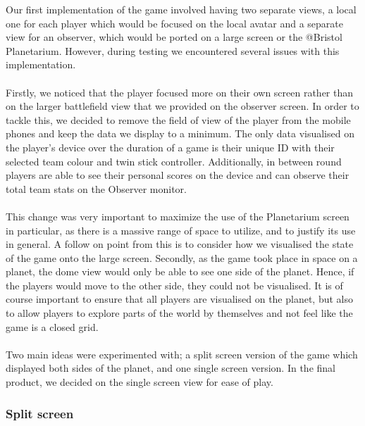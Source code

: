 \documentclass[11pt,a4paper]{article}
\begin{document}
   Our first implementation of the game involved having two separate views, a local one for each player which would be focused on the local avatar and a separate view for an observer, which would be ported on a large screen or the @Bristol Planetarium. However, during testing we encountered several issues with this implementation. \\ \\
   Firstly, we noticed that the player focused more on their own screen rather than on the larger battlefield view that we provided on the observer screen. In order to tackle this, we decided to remove the field of view of the player from the mobile phones and keep the data we display to a minimum. The only data visualised on the player’s device over the duration of a game is their unique ID with their selected team colour and twin stick controller. Additionally, in between round players are able to see their personal scores on the device and can observe their total team stats on the Observer monitor. \\ \\
   This change was very important to maximize the use of the Planetarium screen in particular, as there is a massive range of space to utilize, and to justify its use in general. A follow on point from this is to consider how we visualised the state of the game onto the large screen. 
   Secondly, as the game took place in space on a planet, the dome view would only be able to see one side of the planet. Hence, if the players would move to the other side, they could not be visualised. It is of course important to ensure that all players are visualised on the planet, but also to allow players to explore parts of the world by themselves and not feel like the game is a closed grid. \\ \\  
   Two main ideas were experimented with; a split screen version of the game which displayed both sides of the planet, and one single screen version. In the final product, we decided on the single screen view for ease of play.
   \subsubsection{Split screen} 
   
\end{document}

